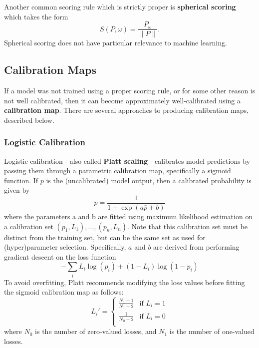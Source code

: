 Another common scoring rule which is strictly proper is {\bf spherical scoring} which takes the form
\begin{equation}
	S(P,\omega) = \frac{P_\omega}{\|P\|}.
\end{equation}
Spherical scoring does not have particular relevance to machine learning.

\subsection{Calibration Maps}



If a model was not trained using a proper scoring rule, or for some other reason is not well calibrated, then it can become approximately well-calibrated using a {\bf calibration map}. There are several approaches to producing calibration maps, described below.

\subsubsection{Logistic Calibration}

Logistic calibration - also called {\bf Platt scaling} \cite{platt} - calibrates model predictions by passing them through a parametric calibration map, specifically a sigmoid function. If $\bar{p}$ is the (uncalibrated) model output, then a calibrated probability is given by
\begin{equation}
	p = \frac{1}{1 + \exp(a\bar{p} + b)}
\end{equation}
where the parameters a and b are fitted using maximum likelihood estimation on a calibration set $(p_1,L_1),\dots,(p_n,L_n)$. Note that this calibration set must be distinct from the training set, but can be the same set as used for (hyper)parameter selection. Specifically, $a$ and $b$ are derived from performing gradient descent on the loss function
\begin{equation}
	- \sum_i L_i \log( p_i ) + (1-L_i) \log(1-p_i)
\end{equation}
To avoid overfitting, Platt recommends modifying the loss values before fitting the sigmoid calibration map as follows:
\begin{equation}
	L_i' = \begin{cases}
		\frac{N_1 + 1}{N_1 + 2} & \text{if }L_i=1 \\
		\frac{1}{N_0 + 2} & \text{if }L_i=0 \\
	\end{cases}
\end{equation} 
where $N_0$ is the number of zero-valued losses, and $N_1$ is the number of one-valued losses. 

